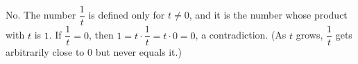 No. The number $\dfrac1t$ is defined only for $t\ne0$, and it is the number whose product with $t$ is $1$. If $\dfrac1t=0$, then $1=t\cdot\dfrac1t=t\cdot0=0$, a contradiction. (As $t$ grows, $\dfrac1t$ gets arbitrarily close to $0$ but never equals it.)
